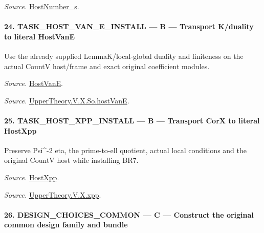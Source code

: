 \emph{Source.} \href{https://github.com/CocoSgt/riemann-hypothesis-lean/blob/7cbf7a0c32fca1badf05931879a37c3f8a2b03b4/src/Development/AutomorphicArithmetic/AutomorphicVarieties/ModularityArgument/ThresholdArguments/DenseThresholdCases/HostNumberS.lean#L18-L28}{HostNumber\_\allowbreak s}.



\paragraph{24. TASK\_\allowbreak HOST\_\allowbreak VAN\_\allowbreak E\_\allowbreak INSTALL — B — Transport K/duality to literal HostVanE}

Use the already supplied LemmaK/local-global duality and finiteness on the actual CountV host/frame and exact original coefficient modules.

\emph{Source.} \href{https://github.com/CocoSgt/riemann-hypothesis-lean/blob/7cbf7a0c32fca1badf05931879a37c3f8a2b03b4/src/Development/AutomorphicArithmetic/AutomorphicVarieties/UnitaryThreeDeformations/HostNumber.lean#L9-L12}{HostVanE}.

\emph{Source.} \href{https://github.com/CocoSgt/riemann-hypothesis-lean/blob/7cbf7a0c32fca1badf05931879a37c3f8a2b03b4/src/Development/AutomorphicArithmetic/AutomorphicVarieties/LevelCohomology/SoHostVanE.lean#L11-L18}{UpperTheory.V.X.So.hostVanE}.



\paragraph{25. TASK\_\allowbreak HOST\_\allowbreak XPP\_\allowbreak INSTALL — B — Transport CorX to literal HostXpp}

Preserve Psi\textasciicircum{}-2 eta, the prime-to-ell quotient, actual local conditions and the original CountV host while installing BR7.

\emph{Source.} \href{https://github.com/CocoSgt/riemann-hypothesis-lean/blob/7cbf7a0c32fca1badf05931879a37c3f8a2b03b4/src/Development/AutomorphicArithmetic/AutomorphicVarieties/UnitaryThreeDeformations/HostNumber.lean#L14-L17}{HostXpp}.

\emph{Source.} \href{https://github.com/CocoSgt/riemann-hypothesis-lean/blob/7cbf7a0c32fca1badf05931879a37c3f8a2b03b4/src/Development/AutomorphicArithmetic/AutomorphicVarieties/LevelCohomology/Xpp.lean#L11-L84}{UpperTheory.V.X.xpp}.



\paragraph{26. DESIGN\_\allowbreak CHOICES\_\allowbreak COMMON — C — Construct the original common design family and bundle}

